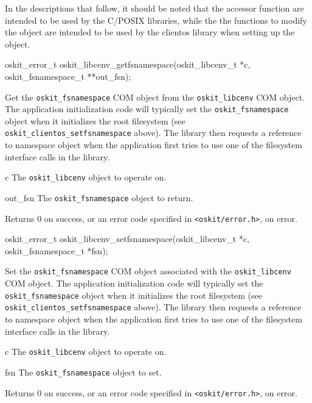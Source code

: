 In the descriptions that follow, it should be noted that the accessor
function are intended to be used by the C/POSIX libraries, while the the
functions to modify the object are intended to be used by the clientos
library when setting up the object. 

\begin{apisyn}

	\funcproto oskit_error_t
		   oskit_libcenv_getfsnamespace(oskit_libcenv_t *c,
				oskit_fsnamespace_t **out_fsn);
\end{apisyn}
\begin{apidesc}
	Get the \texttt{oskit_fsnamespace} COM object from the
	\texttt{oskit_libcenv} COM object. The application initialization
	code will typically set the \texttt{oskit_fsnamespace} object when
	it initializes the root filesystem (see
	\texttt{oskit_clientos_setfsnamespace} above). The \posix{} library
	then requests a reference to namespace object when the application
	first tries to use one of the filesystem interface calls in the
	\posix{} library.
\end{apidesc}
\begin{apiparm}
	\item[c]
		The \texttt{oskit_libcenv} object to operate on.
	\item[out_fsn]
		The \texttt{oskit_fsnamespace} object to return.
\end{apiparm}
\begin{apiret}
	Returns 0 on success, or an error code specified in
	{\tt <oskit/error.h>}, on error.
\end{apiret}


\begin{apisyn}

	\funcproto oskit_error_t
		   oskit_libcenv_setfsnamespace(oskit_libcenv_t *c,
				oskit_fsnamespace_t *fsn);
\end{apisyn}
\begin{apidesc}
	Set the \texttt{oskit_fsnamespace} COM object associated with the
	\texttt{oskit_libcenv} COM object. The application initialization
	code will typically set the \texttt{oskit_fsnamespace} object when
	it initializes the root filesystem (see
	\texttt{oskit_clientos_setfsnamespace} above). The \posix{} library
	then requests a reference to namespace object when the application
	first tries to use one of the filesystem interface calls in the
	\posix{} library.
\end{apidesc}
\begin{apiparm}
	\item[c]
		The \texttt{oskit_libcenv} object to operate on.
	\item[fsn]
		The \texttt{oskit_fsnamespace} object to set.
\end{apiparm}
\begin{apiret}
	Returns 0 on success, or an error code specified in
	{\tt <oskit/error.h>}, on error.
\end{apiret}


